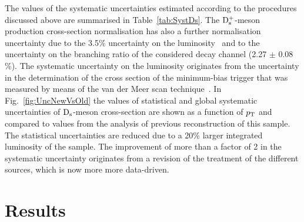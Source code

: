 The values of the systematic uncertainties estimated according to the procedures 
discussed above are summarised
in Table~\ref{tab:SystDs}. 
The ${\rm D_s^+}$-meson production 
cross-section normalisation has also a further normalisation uncertainty
due to the 3.5\% uncertainty on the luminosity~\cite{Abelev:2012sea} 
and to the uncertainty on the branching ratio 
of the considered decay channel (2.27 $\pm$ 0.08 \%). The systematic uncertainty 
on the luminosity originates from the uncertainty 
in the determination of the cross section of the minimum-bias trigger 
that was measured by means of the van der Meer scan technique~\cite{vanderMeer:296752}.
In Fig.~\ref{fig:UncNewVsOld} the values of statistical and global
systematic uncertainties of ${\rm D_s}$-meson cross-section are shown as a function of $p_{\rm T}$ and compared to values from 
the analysis of previous reconstruction of this sample. 
The statistical uncertainties are reduced due to a 20\% larger integrated 
luminosity of the sample. The improvement of more than a factor of 2 in the systematic uncertainty  
originates from a revision of the treatment of the different sources, which is now
more more data-driven.


\section{Results}
